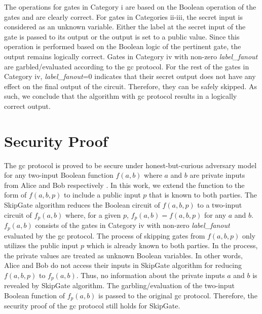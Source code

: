 The operations for gates in Category i are based on the Boolean operation of the gates and are clearly correct.
For gates in Categories ii-iii, the secret input is considered as an unknown variable.
Either the label at the secret input of the gate is passed to its output or the output is set to a public value.
Since this operation is performed based on the Boolean logic of the pertinent gate, the output remains logically correct.
Gates in Category iv with non-zero \textit{label\_fanout} are garbled/evaluated according to the \acrshort{gc} protocol.
For the rest of the gates in Category iv, \textit{label\_fanout}=0 indicates that their secret output does not have any effect on the final output of the circuit.
Therefore, they can be safely skipped.
As such, we conclude that the algorithm with \acrshort{gc} protocol results in a logically correct output.

\section{Security Proof}\label{sec:skipgate-security}
The \acrshort{gc} protocol is proved to be secure under honest-but-curious adversary model for any two-input Boolean function $f(a, b)$ where $a$ and $b$ are private inputs from Alice and Bob respectively \cite{lindell2009proof, bellare2013efficient}.
In this work, we extend the function to the form of $f(a, b, p)$ to include a public input $p$ that is known to both parties.
The SkipGate algorithm reduces the Boolean circuit of $f(a, b, p)$ to a two-input circuit of $f_p(a, b)$ where, for a given $p$, $f_p(a, b) = f(a, b, p)$ for any $a$ and $b$.
$f_p(a, b)$ consists of the gates in Category iv with non-zero \textit{label\_fanout} evaluated by the \acrshort{gc} protocol.
The process of skipping gates from $f(a, b, p)$ only utilizes the public input $p$ which is already known to both parties.
In the process, the private values are treated as unknown Boolean variables.
In other words, Alice and Bob do not access their inputs in SkipGate algorithm for reducing $f(a,b,p)$ to $f_p(a, b)$.
Thus, no information about the private inputs $a$ and $b$ is revealed by SkipGate algorithm.
The garbling/evaluation of the two-input Boolean function of $f_p(a,b)$ is passed to the original \acrshort{gc} protocol.
Therefore, the security proof of the \acrshort{gc} protocol still holds for SkipGate.
